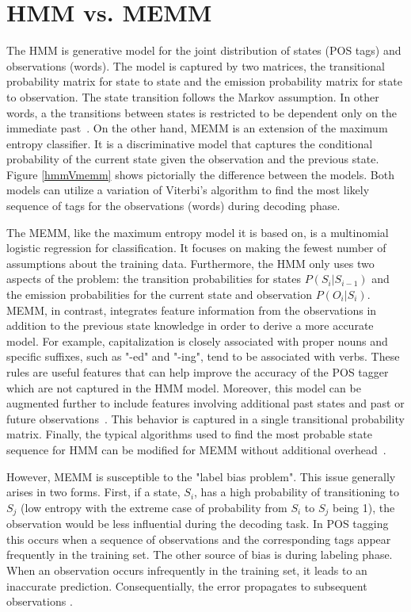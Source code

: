 \section{HMM vs. MEMM}
\label{sec:comparison}

The HMM is generative model for the joint distribution of states (POS tags) and observations (words). The model is captured by two matrices, the transitional probability matrix for state to state and the emission probability matrix for state to observation. The state transition follows the Markov assumption. In other words, a the transitions between states is restricted to be dependent only on the immediate past~\cite{nlpBook}. On the other hand, MEMM is an extension of the maximum entropy classifier. It is a discriminative model that captures the conditional probability of the current state given the observation and the previous state. Figure \ref{hmmVmemm} shows pictorially the difference between the models. Both models can utilize a variation of Viterbi's algorithm to find the most likely sequence of tags for the observations (words) during decoding phase.

The MEMM, like the maximum entropy model it is based on, is a multinomial logistic regression for classification. It focuses on making the fewest number of assumptions about the training data. Furthermore, the HMM only uses two aspects of the problem: the transition probabilities for states $P( S_i | S_{i-1} )$ and the emission probabilities for the current state and observation $P( O_i | S_i )$. MEMM, in contrast, integrates feature information from the observations in addition to the previous state knowledge in order to derive a more accurate model. For example, capitalization is closely associated with proper nouns and specific suffixes, such as "-ed" and "-ing", tend to be associated with verbs. These rules are useful features that can help improve the accuracy of the POS tagger which are not captured in the HMM model. Moreover, this model can be augmented further to include features involving additional past states and past or future observations~\cite{nlpBook}. This behavior is captured in a single transitional probability matrix. Finally, the typical algorithms used to find the most probable state sequence for HMM can be modified for MEMM without additional overhead~\cite{memmPaper}.

However, MEMM is susceptible to the "label bias problem". This issue generally arises in two forms. First, if a state, $S_i$, has a high probability of transitioning to $S_j$ (low entropy with the extreme case of probability from $S_i$ to $S_j$ being 1), the observation would be less influential during the decoding task. In POS tagging this occurs when a sequence of observations and the corresponding tags appear frequently in the training set. The other source of bias is during labeling phase. When an observation occurs infrequently in the training set, it leads to an inaccurate prediction. Consequentially, the error propagates to subsequent observations \cite{labelBiasProblem}.

